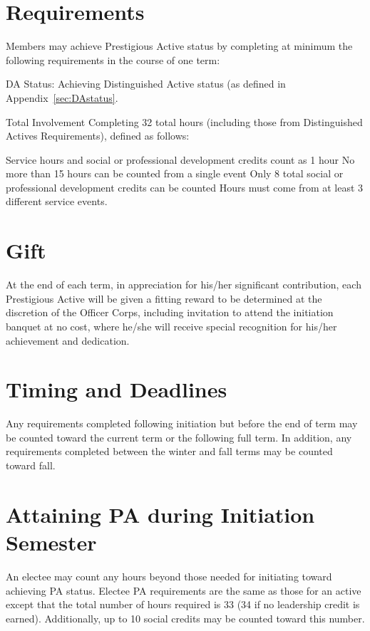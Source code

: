 \section{Requirements} Members may achieve Prestigious Active status by completing at minimum the following requirements in the course of one term:
\begin{enumsubsection}
\item{DA Status:} Achieving Distinguished Active status (as defined in Appendix~\ref{sec:DAstatus}.
\item{Total Involvement} Completing 32 total hours (including those from Distinguished Actives Requirements), defined as follows:
\begin{compactenum}[1.]
\itemnotoc Service hours and social or professional development credits count as 1 hour
\itemnotoc No more than 15 hours can be counted from a single event
\itemnotoc Only 8 total social or professional development credits  can be counted
\itemnotoc Hours must come from at least 3 different service events.
\end{compactenum}
\end{enumsubsection}
\section{Gift} At the end of each term, in appreciation for his/her significant contribution, each Prestigious Active will be given a fitting reward to be determined at the discretion of the Officer Corps, including invitation to attend the initiation banquet at no cost, where he/she will receive special recognition for his/her achievement and dedication.
\section{Timing and Deadlines} Any requirements completed following initiation but before the end of term may be counted toward the current term or the following full term. In addition, any requirements completed between the winter and fall terms may be counted toward fall. 

\section{Attaining PA during Initiation Semester} An electee may count any hours beyond those needed for initiating toward achieving PA status. Electee PA requirements are the same as those for an active except that the total number of hours required is 33 (34 if no leadership credit is earned). Additionally, up to 10 social credits may be counted toward this number.
